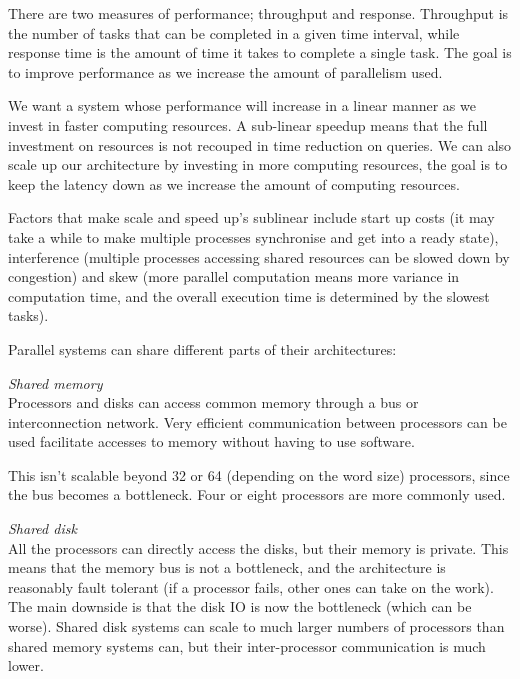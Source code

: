 \begin{description}
    There are two measures of performance; throughput and response. Throughput
    is the number of tasks that can be completed in a given time interval, while
    response time is the amount of time it takes to complete a single task. The
    goal is to improve performance as we increase the amount of parallelism
    used.

    We want a system whose performance will increase in a linear manner as we
    invest in faster computing resources. A sub-linear speedup means that the
    full investment on resources is not recouped in time reduction on queries.
    We can also scale up our architecture by investing in more computing
    resources, the goal is to keep the latency down as we increase the amount of
    computing resources.

    Factors that make scale and speed up's sublinear include start up costs (it
    may take a while to make multiple processes synchronise and get into a ready
    state), interference (multiple processes accessing shared resources can be
    slowed down by congestion) and skew (more parallel computation means more
    variance in computation time, and the overall execution time is determined by
    the slowest tasks).

    Parallel systems can share different parts of their architectures:

    \begin{description}
      \item \textit{Shared memory}\\
        Processors and disks can access common memory through a bus or
        interconnection network. Very efficient communication between processors
        can be used facilitate accesses to memory without having to use software.
    
        This isn't scalable beyond 32 or 64 (depending on the word size)
        processors, since the bus becomes a bottleneck. Four or eight processors
        are more commonly used.

      \item \textit{Shared disk}\\
        All the processors can directly access the disks, but their memory is
        private. This means that the memory bus is not a bottleneck, and the
        architecture is reasonably fault tolerant (if a processor fails, other
        ones can take on the work). The main downside is that the disk IO is now
        the bottleneck (which can be worse). Shared disk systems can scale to
        much larger numbers of processors than shared memory systems can, but
        their inter-processor communication is much lower.


\end{description}
\end{description}
